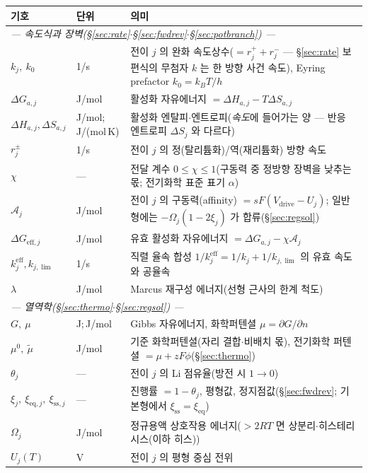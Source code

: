 \documentclass[11pt,a4paper]{article}
\newcommand{\eff}{\mathrm{eff}}
\newcommand{\eq}{\mathrm{eq}}
\newcommand{\drive}{\mathrm{drive}}
\newcommand{\sstat}{\mathrm{ss}}
\begin{document}
\begin{longtable}{p{} p{} p{}}
\toprule 기호 & 단위 & 의미 \\ \midrule \endhead
\multicolumn{3}{l}{\emph{— 속도식과 장벽(\S\ref{sec:rate}$\cdot$\S\ref{sec:fwdrev}$\cdot$\S\ref{sec:potbranch}) —}}\\
$k_j,\ k_0$ & 1/s & 전이 $j$ 의 완화 속도상수($=r_j^++r_j^-$ — \S\ref{sec:rate} 보편식의 무첨자 $k$ 는 한 방향 사건 속도), Eyring prefactor $k_0=k_BT/h$ \\
$\Delta G_{a,j}$ & J/mol & 활성화 자유에너지 $=\Delta H_{a,j}-T\Delta S_{a,j}$ \\
$\Delta H_{a,j},\Delta S_{a,j}$ & {\footnotesize J/mol;\,J/(mol\,K)} & 활성화 엔탈피$\cdot$엔트로피(\emph{속도}에 들어가는 양 — 반응 엔트로피 $\Delta S_j$ 와 다르다) \\
$r_j^\pm$ & 1/s & 전이 $j$ 의 정(탈리튬화)/역(재리튬화) 방향 속도 \\
$\chi$ & --- & 전달 계수 $0\le\chi\le1$(구동력 중 정방향 장벽을 낮추는 몫; 전기화학 표준 표기 $\alpha$) \\
$\mathcal A_j$ & J/mol & 전이 $j$ 의 구동력(affinity) $=sF(V_\drive-U_j)$; 일반형에는 $-\Omega_j(1-2\xi_j)$ 가 합류(\S\ref{sec:regsol}) \\
$\Delta G_{\eff,j}$ & J/mol & 유효 활성화 자유에너지 $=\Delta G_{a,j}-\chi\mathcal A_j$ \\
$k_j^{\eff},k_{j,\lim}$ & 1/s & 직렬 율속 합성 $1/k_j^{\eff}=1/k_j+1/k_{j,\lim}$ 의 유효 속도와 공율속 \\
$\lambda$ & J/mol & Marcus 재구성 에너지(선형 근사의 한계 척도) \\
\multicolumn{3}{l}{\emph{— 열역학(\S\ref{sec:thermo}$\cdot$\S\ref{sec:regsol}) —}}\\
$G,\ \mu$ & J;\,J/mol & Gibbs 자유에너지, 화학퍼텐셜 $\mu=\partial G/\partial n$ \\
$\mu^0,\ \tilde\mu$ & J/mol & 기준 화학퍼텐셜(자리 결합$\cdot$비배치 몫), 전기화학 퍼텐셜 $=\mu+zF\phi$(\S\ref{sec:thermo}) \\
$\theta_j$ & --- & 전이 $j$ 의 Li 점유율(방전 시 $1\to0$) \\
$\xi_j,\ \xi_{\eq,j},\ \xi_{\sstat,j}$ & --- & 진행률 $=1-\theta_j$, 평형값, 정지점값(\S\ref{sec:fwdrev}; 기본형에서 $\xi_{\sstat}=\xi_{\eq}$) \\
$\Omega_j$ & J/mol & 정규용액 상호작용 에너지($>2RT$ 면 상분리$\cdot$히스테리시스(이하 히스)) \\
$U_j(T)$ & V & 전이 $j$ 의 평형 중심 전위 \\

\end{longtable}
\end{document}
